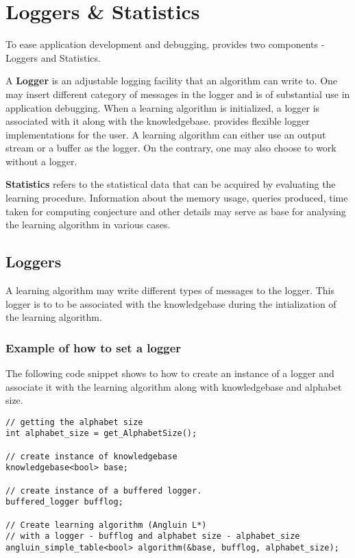 \chapter{Loggers \& Statistics}

To ease application development and debugging, \libalf provides two components - Loggers and Statistics. 

A \textbf{Logger} is an adjustable logging facility that an algorithm can write to. One may insert different category of messages in the logger and is of substantial use in application debugging. When a learning algorithm is initialized, a logger is associated with it along with the knowledgebase. \libalf provides flexible logger implementations for the user. A learning algorithm can either use an output stream or a buffer as the logger. On the contrary, one may also choose to work without a logger.

\textbf{Statistics} refers to the statistical data that can be acquired by evaluating the learning procedure. Information about the memory usage, queries produced, time taken for computing conjecture and other details may serve as base for analysing the learning algorithm in various cases. 

\section{Loggers}

A learning algorithm may write different types of messages to the logger. This logger is to to be associated with the knowledgebase during the intialization of the learning algorithm. 

\subsection*{Example of how to set a logger}
The following code snippet shows to how to create an instance of a logger and associate it with the learning algorithm along with knowledgebase and alphabet size.
\begin{lstlisting}
// getting the alphabet size
int alphabet_size = get_AlphabetSize(); 

// create instance of knowledgebase
knowledgebase<bool> base; 

// create instance of a buffered logger.
buffered_logger bufflog; 

// Create learning algorithm (Angluin L*) 
// with a logger - bufflog and alphabet size - alphabet_size
angluin_simple_table<bool> algorithm(&base, bufflog, alphabet_size); 
\end{lstlisting}

